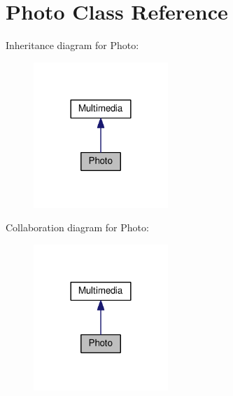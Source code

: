 \hypertarget{classPhoto}{\section{Photo Class Reference}
\label{classPhoto}
}


Inheritance diagram for Photo\+:
\nopagebreak
\begin{figure}[H]
\begin{center}
\leavevmode
\includegraphics[width=144pt]{classPhoto__inherit__graph}
\end{center}
\end{figure}


Collaboration diagram for Photo\+:
\nopagebreak
\begin{figure}[H]
\begin{center}
\leavevmode
\includegraphics[width=144pt]{classPhoto__coll__graph}
\end{center}
\end{figure}
